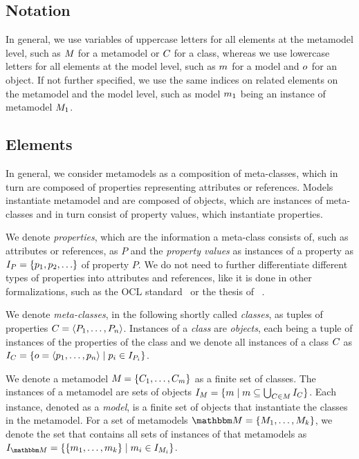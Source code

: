 \subsection{Notation}

In general, we use variables of uppercase letters for all elements at the metamodel level, such as $M_{}$ for a metamodel or $C_{}$ for a class, whereas we use lowercase letters for all elements at the model level, such as $m_{}$ for a model and $o_{}$ for an object.
If not further specified, we use the same indices on related elements on the metamodel and the model level, such as model $m_{1}$ being an instance of metamodel $M_{1}$.

\subsection{Elements}

In general, we consider metamodels as a composition of meta-classes, which in turn are composed of properties representing attributes or references.
Models instantiate metamodel and are composed of objects, which are instances of meta-classes and in turn consist of property values, which instantiate properties.

We denote \emph{properties}, which are the information a meta-class consists of, such as attributes or references, as $P$ and the \emph{property values} as instances of a property as $\metamodelinstances{P} = \setted{p_1, p_2, \dots}$ of property $P$. 
We do not need to further differentiate different types of properties into attributes and references, like it is done in other formalizations, such as the OCL standard~\cite[A.1]{ocl} or the thesis of \citeauthor{kramer2017a}~\cite[2.3.2]{kramer2017a}.

We denote \emph{meta-classes}, in the following shortly called \emph{classes}, as tuples of properties $C_{} = \langle P_1, \dots, P_n \rangle$. 
Instances of a \emph{class} are \emph{objects}, each being a tuple of instances of the properties of the class and we denote all instances of a class $C_{}$ as $I_{C} = \{ o = \langle p_1, \dots, p_n \rangle \mid p_i \in I_{P_i} \}$.

We denote a metamodel $M_{} = \{ C_{1}, \dots, C_{m} \}$ as a finite set of classes.
The instances of a metamodel are sets of objects $I_{M} = \{ m \mid m \subseteq \bigcup_{C_{} \in M_{}} I_{C} \}$.
Each instance, denoted as a \emph{model}, is a finite set of objects that instantiate the classes in the metamodel.
For a set of metamodels $\metamodelset{M} = \setted{\metamodel{M}{1}, \dots, \metamodel{M}{k}}$, we denote the set that contains all sets of instances of that metamodels as $\metamodelinstances{\metamodelset{M}} = \setted{ \setted{\model{m}{1}, \dots, \model{m}{k}} \mid \model{m}{i} \in \metamodelinstances{\metamodel{M}{i}}}$.


